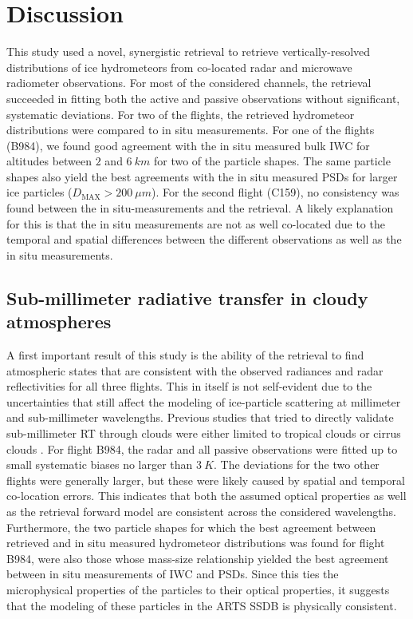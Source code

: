 \documentclass[journal abbreviation, manuscript]{copernicus}
\begin{document}
\section{Discussion}
\label{sec:discussion}

This study used a novel, synergistic retrieval to retrieve vertically-resolved
distributions of ice hydrometeors from co-located radar and microwave radiometer
observations. For most of the considered channels, the retrieval succeeded in
fitting both the active and passive observations without significant, systematic
deviations. For two of the flights, the retrieved hydrometeor distributions were
compared to in situ measurements. For one of the flights (B984), we found good
agreement with the in situ measured bulk IWC for altitudes between $2$ and
$6\ \unit{km}$ for two of the particle shapes. The same particle shapes also
yield the best agreements with the in situ measured PSDs for larger ice
particles ($D_\text{MAX} > 200\ \unit{\mu m}$). For the second flight (C159), no
consistency was found between the in situ-measurements and the retrieval. A
likely explanation for this is that the in situ measurements are not as well
co-located due to the temporal and spatial differences between the different
observations as well as the in situ measurements.

\subsection{Sub-millimeter radiative transfer in cloudy atmospheres}

 A first important result of this study is the ability of the retrieval to find
 atmospheric states that are consistent with the observed radiances and radar
 reflectivities for all three flights. This in itself is not self-evident due to
 the uncertainties that still affect the modeling of ice-particle scattering at
 millimeter and sub-millimeter wavelengths. Previous studies that tried to
 directly validate sub-millimeter RT through clouds were either limited to
 tropical clouds \citep{evans05, eriksson07} or cirrus clouds \citep{fox17}. For
 flight B984, the radar and all passive observations were fitted up to small
 systematic biases no larger than $3\ \unit{K}$. The deviations for the two
 other flights were generally larger, but these were likely caused by spatial
 and temporal co-location errors. This indicates that both the assumed optical
 properties as well as the retrieval forward model are consistent across the
 considered wavelengths. Furthermore, the two particle shapes for which the best
 agreement between retrieved and in situ measured hydrometeor distributions was
 found for flight B984, were also those whose mass-size relationship yielded the
 best agreement between in situ measurements of IWC and PSDs. Since this ties
 the microphysical properties of the particles to their optical properties, it
 suggests that the modeling of these particles in the ARTS SSDB is physically
 consistent.
\end{document}
